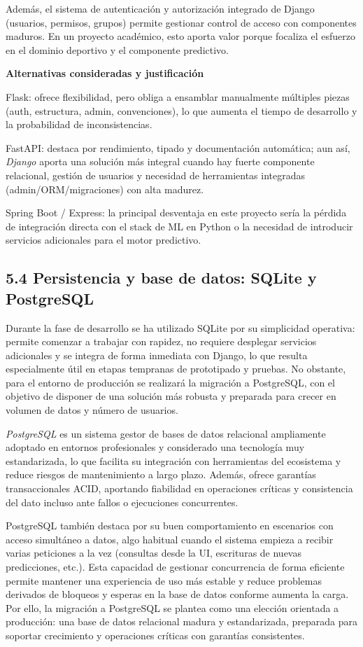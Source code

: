 Además, el sistema de autenticación y autorización integrado de Django (usuarios, permisos, grupos) 
permite gestionar control de acceso con componentes maduros. En un proyecto académico, esto aporta 
valor porque focaliza el esfuerzo en el dominio deportivo y el componente predictivo.

\textbf{Alternativas consideradas y justificación}

Flask: ofrece flexibilidad, pero obliga a ensamblar manualmente múltiples piezas (auth, estructura, 
admin, convenciones), lo que aumenta el tiempo de desarrollo y la probabilidad de inconsistencias.

FastAPI: destaca por rendimiento, tipado y documentación automática; aun así, \textit{Django} aporta una 
solución más integral cuando hay fuerte componente relacional, gestión de usuarios y necesidad de 
herramientas integradas (admin/ORM/migraciones) con alta madurez.

Spring Boot / Express: la principal desventaja en este proyecto sería la pérdida de integración 
directa con el stack de ML en Python o la necesidad de introducir servicios adicionales para el 
motor predictivo.

\subsection{5.4 Persistencia y base de datos: SQLite y PostgreSQL}

Durante la fase de desarrollo se ha utilizado SQLite por su simplicidad operativa: permite comenzar 
a trabajar con rapidez, no requiere desplegar servicios adicionales y se integra de forma inmediata 
con Django, lo que resulta especialmente útil en etapas tempranas de prototipado y pruebas. No 
obstante, para el entorno de producción se realizará la migración a PostgreSQL, con el objetivo de 
disponer de una solución más robusta y preparada para crecer en volumen de datos y número de 
usuarios.

\textit{PostgreSQL} es un sistema gestor de bases de datos relacional ampliamente adoptado en entornos 
profesionales y considerado una tecnología muy estandarizada, lo que facilita su integración con 
herramientas del ecosistema y reduce riesgos de mantenimiento a largo plazo. Además, ofrece garantías 
transaccionales ACID, aportando fiabilidad en operaciones críticas y consistencia del dato incluso 
ante fallos o ejecuciones concurrentes.

PostgreSQL también destaca por su buen comportamiento en escenarios con acceso simultáneo a datos, 
algo habitual cuando el sistema empieza a recibir varias peticiones a la vez (consultas desde la UI, 
escrituras de nuevas predicciones, etc.). Esta capacidad de gestionar concurrencia de forma eficiente 
permite mantener una experiencia de uso más estable y reduce problemas derivados de bloqueos y esperas 
en la base de datos conforme aumenta la carga. Por ello, la migración a PostgreSQL se plantea como 
una elección orientada a producción: una base de datos relacional madura y estandarizada, preparada 
para soportar crecimiento y operaciones críticas con garantías consistentes.

